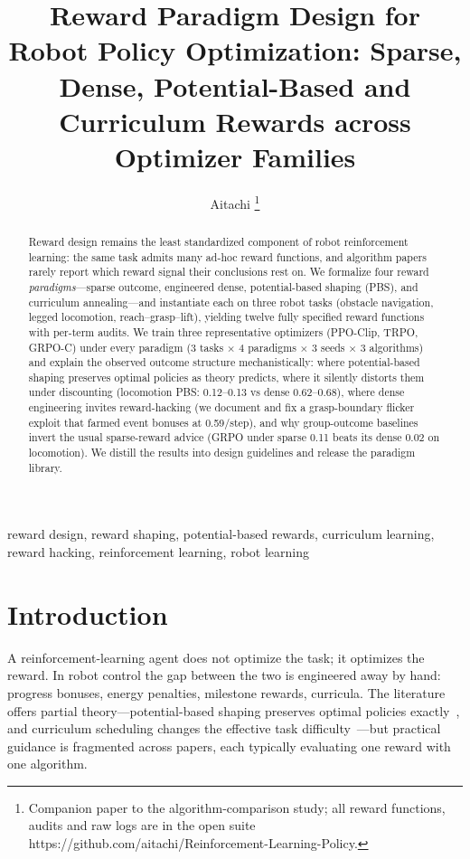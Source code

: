 \documentclass[journal,twoside]{IEEEtran}
\newcommand{\ppo}{\textsc{PPO}}
\newcommand{\trpo}{\textsc{TRPO}}
\newcommand{\grpo}{\textsc{GRPO-C}}
\begin{document}
\title{Reward Paradigm Design for Robot Policy Optimization: Sparse, Dense,
Potential-Based and Curriculum Rewards across Optimizer Families}

\author{Aitachi%
\thanks{Companion paper to the algorithm-comparison study; all reward
functions, audits and raw logs are in the open suite
https://github.com/aitachi/Reinforcement-Learning-Policy.}}

\maketitle

\begin{abstract}
Reward design remains the least standardized component of robot
reinforcement learning: the same task admits many ad-hoc reward functions,
and algorithm papers rarely report which reward signal their conclusions
rest on. We formalize four reward \emph{paradigms}---sparse outcome,
engineered dense, potential-based shaping (PBS), and curriculum
annealing---and instantiate each on three robot tasks (obstacle navigation,
legged locomotion, reach--grasp--lift), yielding twelve fully specified
reward functions with per-term audits. We train three representative
optimizers (\ppo{}-Clip, \trpo{}, \grpo{}) under every paradigm
(3 tasks $\times$ 4 paradigms $\times$ 3 seeds $\times$ 3 algorithms) and
explain the observed outcome structure mechanistically: where potential-based
shaping preserves optimal policies as theory predicts, where it silently
distorts them under discounting (locomotion PBS: 0.12--0.13 vs dense
0.62--0.68), where dense engineering invites reward-hacking (we document
and fix a grasp-boundary flicker exploit that farmed event bonuses at
0.59/step), and why group-outcome baselines invert the usual sparse-reward
advice (GRPO under sparse 0.11 beats its dense 0.02 on locomotion). We
distill the results into design guidelines and release the paradigm
library.
\end{abstract}

\begin{IEEEkeywords}
reward design, reward shaping, potential-based rewards, curriculum
learning, reward hacking, reinforcement learning, robot learning
\end{IEEEkeywords}

\section{Introduction}
A reinforcement-learning agent does not optimize the task; it optimizes the
reward. In robot control the gap between the two is engineered away by
hand: progress bonuses, energy penalties, milestone rewards, curricula.
The literature offers partial theory---potential-based shaping preserves
optimal policies exactly~\cite{ng1999policy}, and curriculum scheduling
changes the effective task difficulty~\cite{bengio2009curriculum}---but
practical guidance is fragmented across papers, each typically evaluating
one reward with one algorithm.
\end{document}
